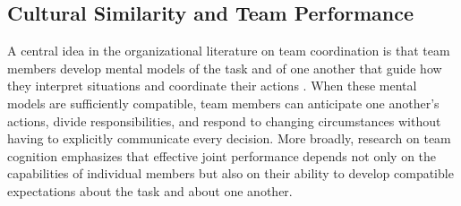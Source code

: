 \documentclass[10pt]{article}
\begin{document}
 
 


 
\subsection{Cultural Similarity and Team Performance}
A central idea in the organizational literature on team coordination is that team members develop mental models of the task and of one another that guide how they interpret situations and coordinate their actions \citep{cannonbowers1993,klimoski1994}. When these mental models are sufficiently compatible, team members can anticipate one another’s actions, divide responsibilities, and respond to changing circumstances without having to explicitly communicate every decision.  More broadly, research on team cognition emphasizes that effective joint performance depends not only on the capabilities of individual members but also on their ability to develop compatible expectations about the task and about one another.
\end{document}
